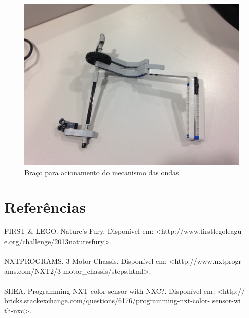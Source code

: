 \documentclass[12pt,a4paper]{article}
\begin{document}
	\begin{figure}[H]
		\includegraphics[width=\linewidth]{../Images/claw_3.JPG}
		\caption{Braço para acionamento do mecanismo das ondas.}
		\label{fig:claw_3}
	\end{figure}

\newpage
\section{Referências}
	FIRST \& LEGO. Nature's Fury. Disponível em: 
	<http://www.firstlegoleagu\\e.org/challenge/2013naturesfury>.\\\\
	NXTPROGRAMS. 3-Motor Chassis. Disponível em: 
	<http://www.nxtprogr\\ams.com/NXT2/3-motor\_chassis/steps.html>.\\\\
	SHEA. Programming NXT color sensor with NXC?. Disponível em: 
	<http://\\bricks.stackexchange.com/questions/6176/programming-nxt-color-
	sensor-wi\\th-nxc>.
\end{document}
